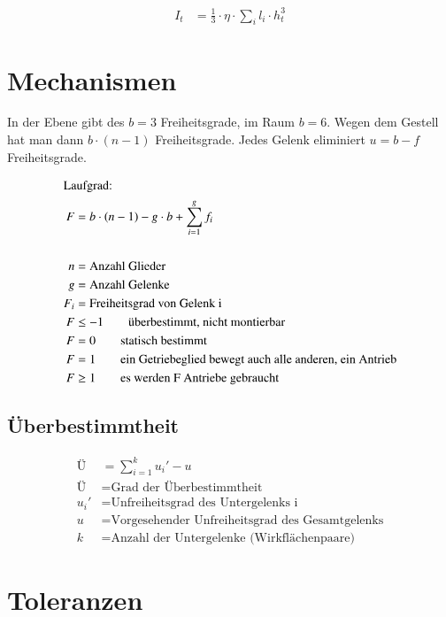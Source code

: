 \begin{align*}
I_t &= \frac{1}{3} \cdot \eta \cdot \sum_{i}^{} l_i \cdot h_t^3
\end{align*}

\newpage


\section{Mechanismen}

In der Ebene gibt des $b = 3$ Freiheitsgrade, im Raum $b = 6$. Wegen dem Gestell hat man dann $b \cdot (n-1)$ Freiheitsgrade. Jedes Gelenk eliminiert $u = b - f$ Freiheitsgrade.

\begin{align*}
\intertext{Laufgrad:}
F &= b \cdot \left( n - 1 \right) - g \cdot b + \sum_{i=1}^{g} f_i \\
\\
n &= \text{Anzahl Glieder} \\
g &= \text{Anzahl Gelenke} \\
F_i &= \text{Freiheitsgrad von Gelenk i} \\
F &\leq -1 \qquad \text{überbestimmt, nicht montierbar} \\
F &= 0 \qquad \text{statisch bestimmt} \\
F &= 1 \qquad \text{ein Getriebeglied bewegt auch alle anderen, ein Antrieb} \\
F &\geq 1 \qquad \text{es werden F Antriebe gebraucht}
\end{align*}


\subsection*{Überbestimmtheit}

\begin{align*}
\text{Ü} &= \sum_{i=1}^{k} u_i' - u \\
\text{Ü} &= \text{Grad der Überbestimmtheit} \\
u_i' &= \text{Unfreiheitsgrad des Untergelenks i} \\
u &= \text{Vorgesehender Unfreiheitsgrad des Gesamtgelenks} \\
k &= \text{Anzahl der Untergelenke (Wirkflächenpaare)}
\end{align*}


\newpage

\section{Toleranzen}

